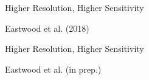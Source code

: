 \documentclass{beamer}
\begin{document}
{
    \begin{frame}[b]{Higher Resolution, Higher Sensitivity}
        \begin{center}
            {\tiny Eastwood et al. (2018)} \\
        \end{center}
    \end{frame}

    \begin{frame}[b]{Higher Resolution, Higher Sensitivity}
        \begin{center}
            {\tiny Eastwood et al. (in prep.)} \\
        \end{center}
    \end{frame}
}
\end{document}
